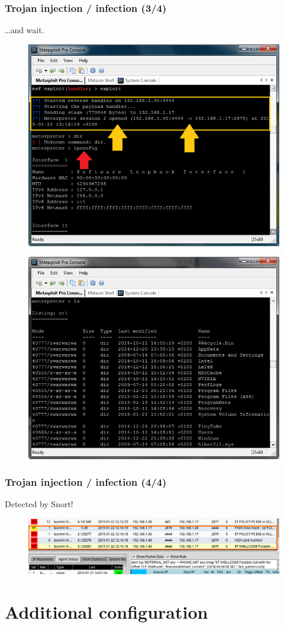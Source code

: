 \documentclass{beamer}
\begin{document}
\begin{frame}
\frametitle{Trojan injection / infection (3/4)}
\ldots and wait.
\begin{figure}
   \includegraphics[width= 0.4\linewidth]{../images/VM_Trojan_5.png}
\end{figure}
\begin{figure}
   \includegraphics[width= 0.4\linewidth]{../images/VM_Trojan_4.png}
\end{figure}
\end{frame}
\begin{frame}
\frametitle{Trojan injection / infection (4/4)}
Detected by Snort!
\begin{figure}
   \includegraphics[width= 1\linewidth]{../images/VM_Trojan_1.png}
\end{figure}
\end{frame}


\section{Additional configuration}
\subsection*{}
\end{document}
